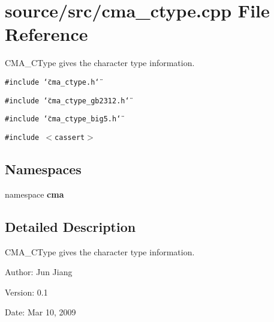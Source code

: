 \section{source/src/cma\_\-ctype.cpp File Reference}
\label{cma__ctype_8cpp}
CMA\_\-CType gives the character type information. 

{\tt \#include \char`\"{}cma\_\-ctype.h\char`\"{}}\par
{\tt \#include \char`\"{}cma\_\-ctype\_\-gb2312.h\char`\"{}}\par
{\tt \#include \char`\"{}cma\_\-ctype\_\-big5.h\char`\"{}}\par
{\tt \#include $<$cassert$>$}\par
\subsection*{Namespaces}
\begin{CompactItemize}
\item 
namespace \textbf{cma}
\end{CompactItemize}


\subsection{Detailed Description}
CMA\_\-CType gives the character type information. 

\begin{Desc}
\item[Author:]Jun Jiang \end{Desc}
\begin{Desc}
\item[Version:]0.1 \end{Desc}
\begin{Desc}
\item[Date:]Mar 10, 2009 \end{Desc}
